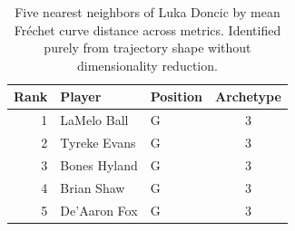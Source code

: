 \begin{table}[htbp]
  \centering\small
  \begin{tabular}{rllc}
    \toprule
    Rank & Player & Position & Archetype \\
    \midrule
    1 & LaMelo Ball & G & 3 \\
    2 & Tyreke Evans & G & 3 \\
    3 & Bones Hyland & G & 3 \\
    4 & Brian Shaw & G & 3 \\
    5 & De'Aaron Fox & G & 3 \\
    \bottomrule
  \end{tabular}
  \caption{Five nearest neighbors of Luka Doncic by mean Fr\'{e}chet curve distance across metrics. Identified purely from trajectory shape without dimensionality reduction.}
  \label{tab:Luka_Doncic_frechet_curve_neighbors}
\end{table}


